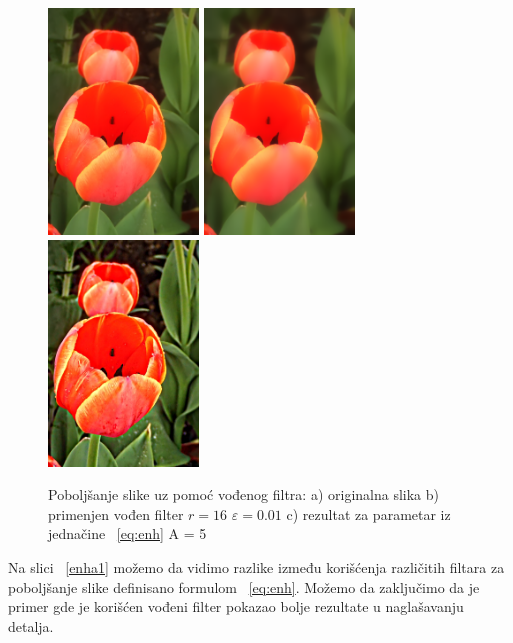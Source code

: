\documentclass[a4paper,12pt,titlepage]{article}
\begin{document}
\begin{figure}[ht!]
\centering
\includegraphics[width=40mm]{img/flower.png}
\includegraphics[width=40mm]{img/flowerEGF.png}
\includegraphics[width=40mm]{img/flowerER.png}
\caption{Poboljšanje slike uz pomoć vođenog filtra: a) originalna slika b) primenjen vođen filter $r = 16$ $\varepsilon = 0.01$ c) rezultat za parametar iz jednačine ~\ref{eq:enh} A = 5 }
\label{enha}
\end{figure}

Na slici ~\ref{enha1} možemo da vidimo razlike između korišćenja različitih filtara za  poboljšanje slike definisano formulom ~\ref{eq:enh}. Možemo da zaključimo da je primer gde je korišćen vođeni filter pokazao bolje rezultate u naglašavanju detalja.
\end{document}
